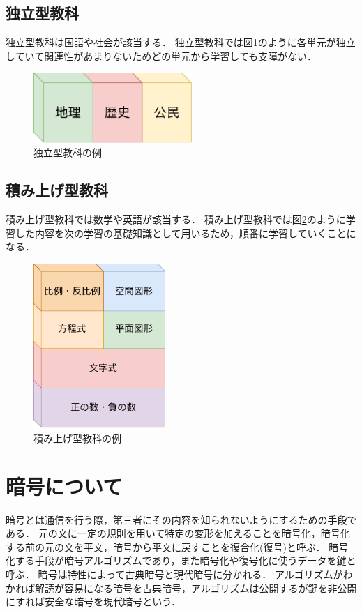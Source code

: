 \documentclass[a4j,12pt]{jsarticle}
\begin{document}
\subsection{独立型教科}
独立型教科は国語や社会が該当する．
独立型教科では図\ref{fig:01}のように各単元が独立していて関連性があまりないためどの単元から学習しても支障がない．
\begin{figure}[H]
\centering
\includegraphics[width=6cm]{01.pdf}
\caption{独立型教科の例}
\label{fig:01}
\end{figure} 

\subsection{積み上げ型教科}
積み上げ型教科では数学や英語が該当する．
積み上げ型教科では図\ref{fig:04}のように学習した内容を次の学習の基礎知識として用いるため，順番に学習していくことになる．

\begin{figure}[H]
\centering
\includegraphics[width=5cm]{04.pdf}
\caption{積み上げ型教科の例}
\label{fig:04}
\end{figure} 

\newpage
\section{暗号について}
暗号とは通信を行う際，第三者にその内容を知られないようにするための手段である．
元の文に一定の規則を用いて特定の変形を加えることを暗号化，暗号化する前の元の文を平文，暗号から平文に戻すことを復合化(復号)と呼ぶ．
暗号化する手段が暗号アルゴリズムであり，また暗号化や復号化に使うデータを鍵と呼ぶ．
暗号は特性によって古典暗号と現代暗号に分かれる．
アルゴリズムがわかれば解読が容易になる暗号を古典暗号，アルゴリズムは公開するが鍵を非公開にすれば安全な暗号を現代暗号という．
\end{document}
